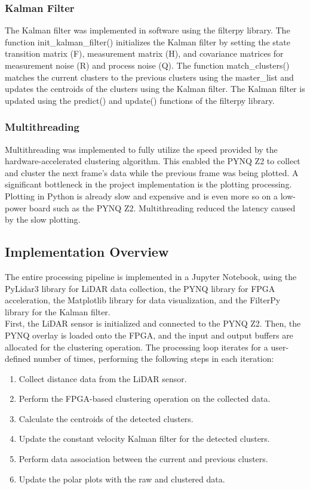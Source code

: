 \documentclass[journal]{IEEEtran} %
\begin{document}
\subsubsection{Kalman Filter}
The Kalman filter was implemented in software using the filterpy library. The function init\_kalman\_filter() initializes the Kalman filter by setting the state transition matrix (F), measurement matrix (H), and covariance matrices for measurement noise (R) and process noise (Q). The function match\_clusters() matches the current clusters to the previous clusters using the master\_list and updates the centroids of the clusters using the Kalman filter. The Kalman filter is updated using the predict() and update() functions of the filterpy library. \\

\subsubsection{Multithreading}
Multithreading was implemented to fully utilize the speed provided by the hardware-accelerated clustering algorithm. This enabled the PYNQ Z2 to collect and cluster the next frame's data while the previous frame was being plotted. A significant bottleneck in the project implementation is the plotting processing. Plotting in Python is already slow and expensive and is even more so on a low-power board such as the PYNQ Z2. Multithreading reduced the latency caused by the slow plotting.\\


\subsection{Implementation Overview}

The entire processing pipeline is implemented in a Jupyter Notebook, using the PyLidar3 library for LiDAR data collection, the PYNQ library for FPGA acceleration, the Matplotlib library for data visualization, and the FilterPy library for the Kalman filter.\\

First, the LiDAR sensor is initialized and connected to the PYNQ Z2. Then, the PYNQ overlay is loaded onto the FPGA, and the input and output buffers are allocated for the clustering operation. The processing loop iterates for a user-defined number of times, performing the following steps in each iteration:

\begin{enumerate}
\item Collect distance data from the LiDAR sensor.
\item Perform the FPGA-based clustering operation on the collected data.
\item Calculate the centroids of the detected clusters.
\item Update the constant velocity Kalman filter for the detected clusters.
\item Perform data association between the current and previous clusters.
\item Update the polar plots with the raw and clustered data.
\end{enumerate}
\end{document}
